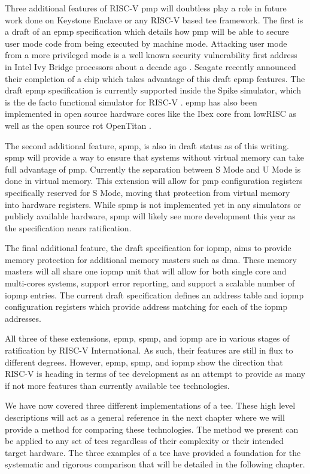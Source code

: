 Three additional features of RISC-V \gls{pmp} will doubtless play a role in future work done on Keystone Enclave or any RISC-V based \gls{tee} framework. The first is a draft of an \gls{epmp} specification which details how \gls{pmp} will be able to secure user mode code from being executed by machine mode. Attacking user mode from a more privileged mode is a well known security vulnerability first address in Intel Ivy Bridge processors about a decade ago \cite{6922075}. Seagate recently announced their completion of a chip which takes advantage of this draft \gls{epmp} features. The draft \gls{epmp} specification is currently supported inside the Spike simulator, which is the de facto functional simulator for RISC-V \cite{asanovic2016rocket}. \gls{epmp} has also been implemented in open source hardware cores like the Ibex core from lowRISC \cite{urlIbex} as well as the open source \gls{rot} OpenTitan \cite{guilley2021implementing}.

The second additional feature, \gls{spmp}, is also in draft status as of this writing. \gls{spmp} will provide a way to ensure that systems without virtual memory can take full advantage of \gls{pmp}. Currently the separation between S Mode and U Mode is done in virtual memory. This extension will allow for \gls{pmp} configuration registers specifically reserved for S Mode, moving that protection from virtual memory into hardware registers. While \gls{spmp} is not implemented yet in any simulators or publicly available hardware, \gls{spmp} will likely see more development this year as the specification nears ratification.

The final additional feature, the draft specification for \gls{iopmp}, aims to provide memory protection for additional memory masters such as \gls{dma}. These memory masters will all share one \gls{iopmp} unit that will allow for both single core and multi-cores systems, support error reporting, and support a scalable number of \gls{iopmp} entries. The current draft specification defines an address table and \gls{iopmp} configuration registers which provide address matching for each of the \gls{iopmp} addresses.

All three of these extensions, \gls{epmp}, \gls{spmp}, and \gls{iopmp} are in various stages of ratification by RISC-V International. As such, their features are still in flux to different degrees. However, \gls{epmp}, \gls{spmp}, and \gls{iopmp} show the direction that RISC-V is heading in terms of \gls{tee} development as an attempt to provide as many if not more features than currently available \gls{tee} technologies.

We have now covered three different implementations of a \gls{tee}. These high level descriptions will act as a general reference in the next chapter where we will provide a method for comparing these technologies. The method we present can be applied to any set of \glspl{tee} regardless of their complexity or their intended target hardware. The three examples of a \gls{tee} have provided a foundation for the systematic and rigorous comparison that will be detailed in the following chapter.

